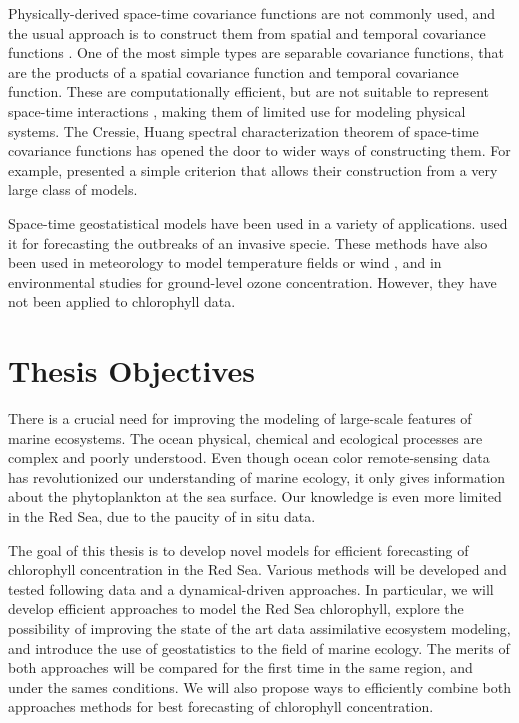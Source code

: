 Physically-derived space-time covariance functions are not commonly used, and
the usual approach is to construct them from spatial and temporal covariance
functions \citep{Gneiting2010}. One of the most simple types are separable
covariance functions, that are the products of a spatial covariance function
and temporal covariance function. These are computationally efficient, but are
not suitable to represent space-time interactions \citep{Cressie1999,
Stein2005}, making them of limited use for modeling physical systems. The
Cressie, Huang spectral characterization theorem of space-time covariance
functions has opened the door to wider ways of constructing them. For example,
\citet{Gneiting2002} presented a simple criterion that allows their
construction from a very large class of models. 

Space-time geostatistical models have been used in a variety of applications.
\citet{Hohn1993} used it for forecasting the outbreaks of an invasive specie.
These methods have also been used in meteorology to model temperature fields
\citep{Handcock1994, North2011} or wind \citep{Cressie1999, Gneiting2002}, and
in environmental studies for ground-level ozone concentration. However,
they have not been applied to chlorophyll data.

\section{Thesis Objectives}

There is a crucial need for improving the modeling of large-scale features of
marine ecosystems. The ocean physical, chemical and ecological processes are
complex and poorly understood. Even though ocean color remote-sensing data has
revolutionized our understanding of marine ecology, it only gives information
about the phytoplankton at the sea surface. Our knowledge is even more limited
in the Red Sea, due to the paucity of in situ data.

The goal of this thesis is to develop novel models for efficient forecasting of
chlorophyll concentration in the Red Sea. Various methods will be developed and
tested following data and a dynamical-driven approaches. In particular, we will
develop efficient approaches to model the Red Sea chlorophyll, explore the
possibility of improving the state of the art data assimilative ecosystem
modeling, and introduce the use of geostatistics to the field of marine
ecology. The merits of both approaches will be compared for the first time in
the same region, and under the sames conditions. We will also propose ways to
efficiently combine both approaches methods for best forecasting of chlorophyll
concentration.

